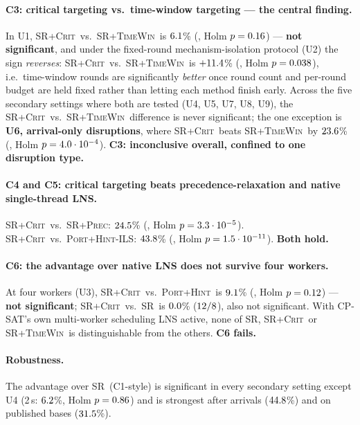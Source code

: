\documentclass[letterpaper]{article} %
\newcommand{\base}{\textsc{SR}}
\newcommand{\crit}{\textsc{SR+Crit}}
\newcommand{\tw}{\textsc{SR+TimeWin}}
\newcommand{\precn}{\textsc{SR+Prec}}
\newcommand{\ph}{\textsc{Port+Hint}}
\newcommand{\native}{\textsc{Port+Hint-ILS}}
\begin{document}
\paragraph{C3: critical targeting vs.\ time-window targeting --- the central finding.} In U1, \crit\ vs.\ \tw\ is $6.1$\% (\UOneBTwocritVsBThreetimewinWL, Holm $p=0.16$) --- \textbf{not significant}, and under the fixed-round mechanism-isolation protocol (U2) the sign \emph{reverses}: \crit\ vs.\ \tw\ is $+11.4$\% (\UTwoMTwocritVsMTwotimewinWL, Holm $p=0.038$), i.e.\ time-window rounds are significantly \emph{better} once round count and per-round budget are held fixed rather than letting each method finish early. Across the five secondary settings where both are tested (U4, U5, U7, U8, U9), the \crit\ vs.\ \tw\ difference is never significant; the one exception is \textbf{U6, arrival-only disruptions}, where \crit\ beats \tw\ by $23.6$\% (\USixBTwocritVsBThreetimewinWL, Holm $p=4.0\cdot10^{-4}$). \textbf{C3: inconclusive overall, confined to one disruption type.}

\paragraph{C4 and C5: critical targeting beats precedence-relaxation and native single-thread LNS.} \crit\ vs.\ \precn: $24.5$\% (\UOneBTwocritVsBFourprecWL, Holm $p=3.3\cdot10^{-5}$). \crit\ vs.\ \native: $43.8$\% (\UOneBTwocritVsBFivenativeOnewWL, Holm $p=1.5\cdot10^{-11}$). \textbf{Both hold.}

\paragraph{C6: the advantage over native LNS does not survive four workers.} At four workers (U3), \crit\ vs.\ \ph\ is $9.1$\% (\UThreeBTwocritVsBSixporthintWL, Holm $p=0.12$) --- \textbf{not significant}; \crit\ vs.\ \base\ is $0.0$\% ($12/8$), also not significant. With CP-SAT's own multi-worker scheduling LNS active, none of \base, \crit\ or \tw\ is distinguishable from the others. \textbf{C6 fails.}

\paragraph{Robustness.} The advantage over \base\ (C1-style) is significant in every secondary setting except U4 (2\,s: $6.2$\%, Holm $p=0.86$) and is strongest after arrivals ($44.8$\%) and on published bases ($31.5$\%).
\end{document}
